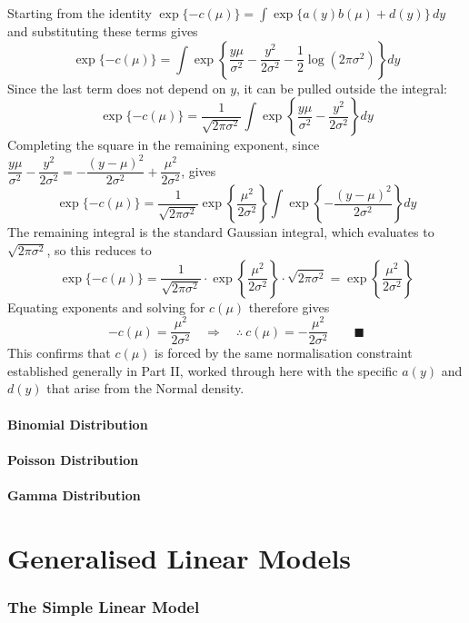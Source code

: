 \documentclass[12pt,a4paper]{report}
\begin{document}
Starting from the identity $\exp\{-c(\mu)\} = \int \exp\{a(y)b(\mu) + d(y)\}\,dy$ and substituting these terms gives
\[
\exp\{-c(\mu)\} = \int \exp\left\{\frac{y\mu}{\sigma^2} - \frac{y^2}{2\sigma^2} - \frac{1}{2}\log(2\pi\sigma^2)\right\} dy
\]
Since the last term does not depend on $y$, it can be pulled outside the integral:
\[
\exp\{-c(\mu)\} = \frac{1}{\sqrt{2\pi\sigma^2}} \int \exp\left\{\frac{y\mu}{\sigma^2} - \frac{y^2}{2\sigma^2}\right\} dy
\]
Completing the square in the remaining exponent, since $\dfrac{y\mu}{\sigma^2} - \dfrac{y^2}{2\sigma^2} = -\dfrac{(y-\mu)^2}{2\sigma^2} + \dfrac{\mu^2}{2\sigma^2}$, gives
\[
\exp\{-c(\mu)\} = \frac{1}{\sqrt{2\pi\sigma^2}} \exp\left\{\frac{\mu^2}{2\sigma^2}\right\} \int \exp\left\{-\frac{(y-\mu)^2}{2\sigma^2}\right\} dy
\]
The remaining integral is the standard Gaussian integral, which evaluates to $\sqrt{2\pi\sigma^2}$, so this reduces to
\[
\exp\{-c(\mu)\} = \frac{1}{\sqrt{2\pi\sigma^2}} \cdot \exp\left\{\frac{\mu^2}{2\sigma^2}\right\} \cdot \sqrt{2\pi\sigma^2} = \exp\left\{\frac{\mu^2}{2\sigma^2}\right\}
\]
Equating exponents and solving for $c(\mu)$ therefore gives
\[
-c(\mu) = \frac{\mu^2}{2\sigma^2} \quad\Longrightarrow\quad \therefore\ c(\mu) = -\frac{\mu^2}{2\sigma^2} \qquad \blacksquare
\]
This confirms that $c(\mu)$ is forced by the same normalisation constraint established generally in Part II, worked through here with the specific $a(y)$ and $d(y)$ that arise from the Normal density.

\subsection{Binomial Distribution}
\subsection{Poisson Distribution}
\subsection{Gamma Distribution}

\part{Generalised Linear Models}

\section{The Simple Linear Model}
\end{document}
